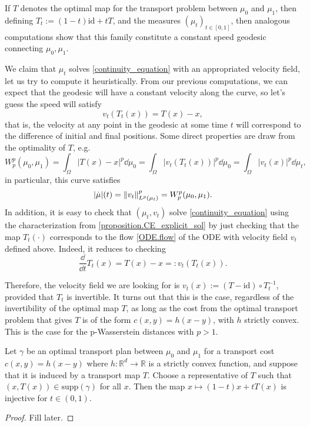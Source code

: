 If $T$ denotes the optimal map for the transport problem between $\mu_0$ and $\mu_1$, then defining $T_t := (1-t)\text{id} + tT$, and the measures $(\mu_t)_{t \in [0,1]}$, then analogous computations show that this family constitute a constant speed geodesic connecting $\mu_0, \mu_1$. 

We claim that $\mu_t$ solves \eqref{continuity_equation} with an appropriated velocity field, let us try to compute it heuristically. From our previous computations, we can expect that the geodesic will have a constant velocity along the curve, so let's guess the speed will satisfy 
\begin{equation}
v_t(T_t(x)) = T(x) - x,
\end{equation}
that is, the velocity at any point in the geodesic at some time $t$ will correspond to the difference of initial and final positions. Some direct properties are draw from the optimality of $T$, e.g. 
\begin{equation}
W_p^p(\mu_0, \mu_1) = \int_{\Omega}|T(x) - x|^p\dd\mu_0 = \int_{\Omega}|v_t(T_t(x))|^p\dd\mu_0 = \int_{\Omega}|v_t(x)|^p\dd\mu_t,
\end{equation}  
in particular, this curve satisfies 
\begin{equation}
|\dot{\mu}|(t) = \left\lVert v_t\right\rVert^p_{L^p(\mu_t)} = W_p^p(\mu_0, \mu_1).
\end{equation}
In addition, it is easy to check that $(\mu_t, v_t)$ solve \eqref{continuity_equation} using the characterization from \ref{proposition.CE_explicit_sol} by just checking that the map $T_t(\cdot)$ corresponds to the flow \eqref{ODE.flow} of the ODE with velocity field $v_t$ defined above. Indeed, it reduces to checking 
\begin{equation}
\frac{\dd}{\dd t}T_t(x)= T(x) - x =: v_t(T_t(x)).
\end{equation}

Therefore, the velocity field we are looking for is $v_t(x) := (T - \text{id})\circ T_t^{-1}$, provided that $T_t$ is invertible. It turns out that this is the case, regardless of the invertibility of the optimal map $T$, as long as the cost from the optimal transport problem that gives $T$ is of the form $c(x,y) = h(x-y)$, with $h$ strictly convex. This is the case for the p-Wasserstein distances with $p>1$. 

\begin{lemma}
	\label{lemma.invertibily_Tt}
	Let $\gamma$ be an optimal transport plan between $\mu_0$ and $\mu_1$ for a transport
	cost $c(x, y) =  h(x-y)$ where $h : \mathbb{R}^d \to \mathbb{R}$ is a strictly convex function, and suppose
	that it is induced by a transport map $T$. Choose a representative of $T$ such that
	$(x, T(x)) \in \text{supp}(\gamma)$ for all $x$. Then the map $x \mapsto (1 - t)x + tT(x)$ is injective for $t \in (0,1)$.
\end{lemma}
\begin{proof}
	Fill later. 
\end{proof}


